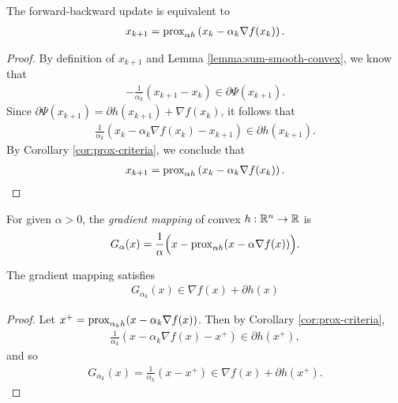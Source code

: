 \begin{prop}\label{prop:foward-backward-prox-form}
    The forward-backward update is equivalent to
    \begin{align*}
        x_{k+1} = \operatorname{prox}_{\alpha h}\left(x_k - \alpha_k\nabla f(x_k)\right).
    \end{align*}
\end{prop}

\begin{proof}
    By definition of $x_{k+1}$ and Lemma \ref{lemma:sum-smooth-convex}, we know that
    \begin{align*}
        -\frac{1}{\alpha_k}\left(x_{k+1}-x_{k}\right) \in \partial\Psi(x_{k+1}).
    \end{align*}
    Since $\partial\Psi(x_{k+1}) = \partial h(x_{k+1}) + \nabla f(x_{k})$, it follows that
    \begin{align*}
        \frac{1}{\alpha_k}\left(x_{k}-\alpha_k\nabla f(x_{k})-x_{k+1}\right) \in \partial h(x_{k+1}).
    \end{align*}
    By Corollary \ref{cor:prox-criteria}, we conclude that
    \begin{align*}
        x_{k+1} = \operatorname{prox}_{\alpha h}\left(x_k - \alpha_k\nabla f(x_k)\right).
    \end{align*}
\end{proof}

\begin{defn}
    For given $\alpha > 0$, the \emph{gradient mapping} of convex $h: \mathbb{R}^n \to \mathbb{R}$ is
    \begin{align*}
        G_{\alpha}(x) = \frac{1}{\alpha}\Bigl(x - \operatorname{prox}_{\alpha h}(x - \alpha\nabla f(x))\Bigr).
    \end{align*}
\end{defn}

\begin{prop}
    The gradient mapping satisfies
    \begin{align*}
        G_{\alpha_k}(x) \in \nabla f(x) + \partial h(x)
    \end{align*}
\end{prop}

\begin{proof}
    Let $x^+ = \operatorname{prox}_{\alpha_k h}(x - \alpha_k\nabla f(x))$. Then by Corollary \ref{cor:prox-criteria},
    \begin{align*}
        \frac{1}{\alpha_k}\left(x - \alpha_k\nabla f(x)-x^+\right) \in \partial h(x^+),
    \end{align*}
    and so
    \begin{align*}
        G_{\alpha_k}(x) = \frac{1}{\alpha_k}\left(x - x^+\right) \in \nabla f(x) + \partial h(x^+).
    \end{align*}
\end{proof}

